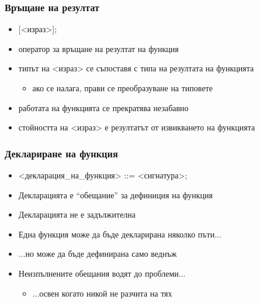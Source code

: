 \documentclass[alsotrans]{beamerswitch}
\begin{document}
\begin{frame}
  \frametitle{Връщане на резултат}

  \begin{itemize}[<+->]
  \item {} [<израз>]\tta;
  \item оператор за връщане на резултат на функция
  \item типът на <израз> се съпоставя с типа на резултата на функцията
    \begin{itemize}
    \item ако се налага, прави се преобразуване на типовете
    \end{itemize}
  \item работата на функцията се прекратява незабавно
  \item стойността на <израз> е резултатът от извикването на функцията
  \end{itemize}
\end{frame}

\begin{frame}
  \frametitle{Деклариране на функция}

  \begin{itemize}[<+->]
  \item{} <декларация\_на\_функция> ::= <сигнатура>\tta;
  \item Декларацията е ``обещание'' за дефиниция на функция
  \item Декларацията не е задължителна
  \item Една функция може да бъде декларирана няколко пъти...
  \item ...но може да бъде дефинирана \alert{само веднъж}
  \item Неизпълнените обещания водят до проблеми...
    \begin{itemize}
    \item ...освен когато никой не разчита на тях
    \end{itemize}
  \end{itemize}
\end{frame}
\end{document}
